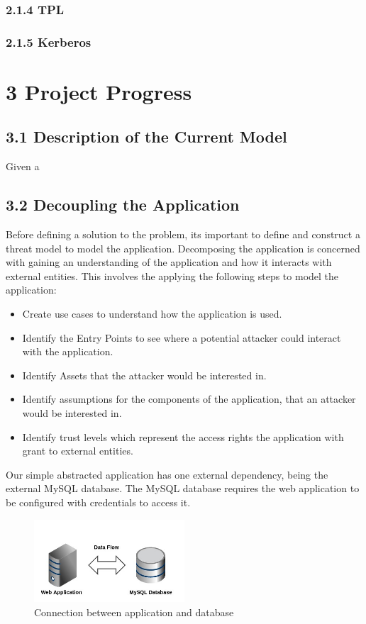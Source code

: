 \documentclass[11pt, a4paper, twoside, openright, notitlepage]{report}
\begin{document}
\subsubsection*{2.1.4 TPL}
\subsubsection*{2.1.5 Kerberos}



\section*{3 Project Progress}
\subsection*{3.1 Description of the Current Model}
Given a 



\subsection*{3.2 Decoupling the Application}
Before defining a solution to the problem, its important to define and construct a threat model to model the application. Decomposing the application is concerned with gaining an understanding of the application and how it interacts with external entities. This involves the applying the following steps to model the application:  

\begin{itemize}
  \item Create use cases to understand how the application is used.
  \item Identify the Entry Points to see where a potential attacker could interact with the application.
  \item Identify Assets that the attacker would be interested in.
  \item Identify assumptions for the components of the application, that an attacker would be interested in.
  \item Identify trust levels which represent the access rights the application with grant to external entities. 
\end{itemize}

Our simple abstracted application has one external dependency, being the external MySQL database.  The MySQL database requires the web application to be configured with credentials to access it. 

\begin{figure}[!ht]
    \centering
    \includegraphics[width=0.5\textwidth]{external-overview.jpg}
    \caption{Connection between application and database}
\end{figure}
\end{document}
